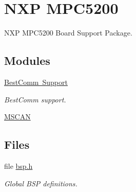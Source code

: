 \hypertarget{group__RTEMSBSPsPowerPCGen5200}{}\section{N\+XP M\+P\+C5200}
\label{group__RTEMSBSPsPowerPCGen5200}


N\+XP M\+P\+C5200 Board Support Package.  


\subsection*{Modules}
\begin{DoxyCompactItemize}
\item 
\mbox{\hyperlink{group__BestComm}{Best\+Comm Support}}
\begin{DoxyCompactList}\small\item\em Best\+Comm support. \end{DoxyCompactList}\item 
\mbox{\hyperlink{group__RTEMSBSPsPowerPCGen5200MSCAN}{M\+S\+C\+AN}}
\end{DoxyCompactItemize}
\subsection*{Files}
\begin{DoxyCompactItemize}
\item 
file \mbox{\hyperlink{bsps_2powerpc_2gen5200_2include_2bsp_8h}{bsp.\+h}}
\begin{DoxyCompactList}\small\item\em Global B\+SP definitions. \end{DoxyCompactList}\end{DoxyCompactItemize}
